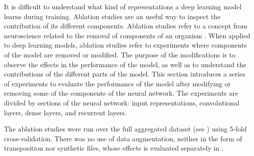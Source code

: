 
It is difficult to understand what kind of representations a
deep learning model learns during training. Ablation studies
are an useful way to inspect the contribution of its
different components. Ablation studies refer to a concept
from neuroscience related to the removal of components of an
organism \parencite{meyes2019ablation}. When applied to deep
learning models, ablation studies refer to experiments where
components of the model are removed or modified. The purpose
of the modifications is to observe the effects in the
performance of the model, as well as to understand the
contributions of the different parts of the model. This
section introduces a series of experiments to evaluate the
performance of the model after modifying or removing some of
the components of the neural network. The experiments are
divided by sections of the neural network: input
representations, convolutional layers, dense layers, and
recurrent layers.

The ablation studies were run over the full aggregated
dataset (see ) using 5-fold
cross-validation. There was no use of data augmentation,
neither in the form of transposition nor synthetic files,
whose effects is evaluated separately in
.
